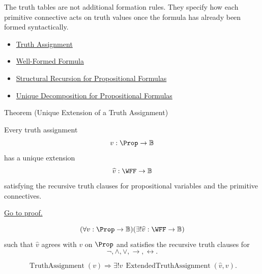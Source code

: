 \begin{remark*}[Examples]
The truth tables are not additional formation rules. They specify how each
primitive connective acts on truth values once the formula has already been
formed syntactically.
\end{remark*}

\begin{dependencies}
\begin{itemize}
  \item \hyperref[def:truth-assignment-propositional-logic]{Truth Assignment}
  \item \hyperref[def:well-formed-formula]{Well-Formed Formula}
  \item \hyperref[thm:structural-recursion-propositional-formulas]{Structural Recursion for Propositional Formulas}
  \item \hyperref[thm:unique-decomposition-propositional-formulas]{Unique Decomposition for Propositional Formulas}
\end{itemize}
\end{dependencies}


\begin{theorembox}{Theorem (Unique Extension of a Truth Assignment)}
\begin{theorem}
\label{thm:unique-extension-truth-assignment-propositional-logic}
Every truth assignment
\[
v:\Prop\to\mathbb{B}
\]
has a unique extension
\[
\widehat v:\WFF\to\mathbb{B}
\]
satisfying the recursive truth clauses for propositional variables and the
primitive connectives.

\noindent\hyperref[prf:unique-extension-truth-assignment-propositional-logic]{Go to proof.}
\end{theorem}
\end{theorembox}

\begin{remark*}
\[
(\forall v:\Prop\to\mathbb{B})(\exists!\widehat v:\WFF\to\mathbb{B})
\]
such that \(\widehat v\) agrees with \(v\) on \(\Prop\) and satisfies the
recursive truth clauses for
\[
\neg,\land,\lor,\to,\leftrightarrow.
\]
\end{remark*}

\begin{remark*}
\[
\operatorname{TruthAssignment}(v)
\Longrightarrow
\exists!\widehat v\,
\operatorname{ExtendedTruthAssignment}(\widehat v,v).
\]
\end{remark*}

